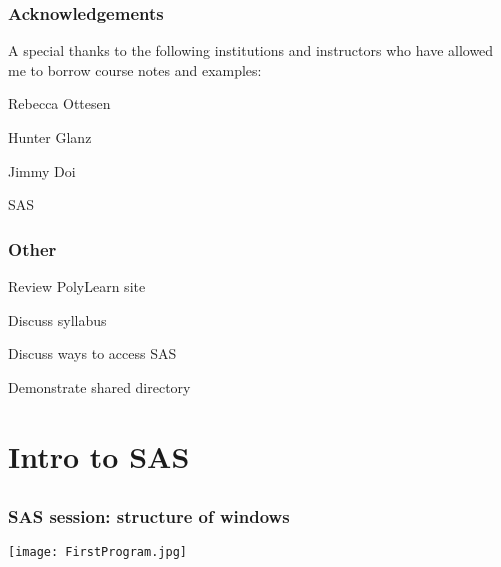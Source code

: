 \begin{frame}
\frametitle{Acknowledgements}
A special thanks to the following institutions and instructors who have allowed me to borrow course notes and examples:
\bi
\item Rebecca Ottesen
\item Hunter Glanz
\item Jimmy Doi
\item SAS
\ei
\end{frame}

\begin{frame}
\frametitle{Other}
\bi
\item Review PolyLearn site
\item Discuss syllabus
\item Discuss ways to access SAS
\item Demonstrate shared directory
\ei
\end{frame}


\section[Introduction to SAS]{Intro to SAS}
\begin{frame}
\end{frame}
\subsection{}

\begin{frame}[fragile]
\fto
{}
\footnotesize
{}
\emp
\end{frame}

\begin{frame}
\frametitle{SAS session: structure of windows}
\texttt{[image: FirstProgram.jpg]}
\end{frame}

